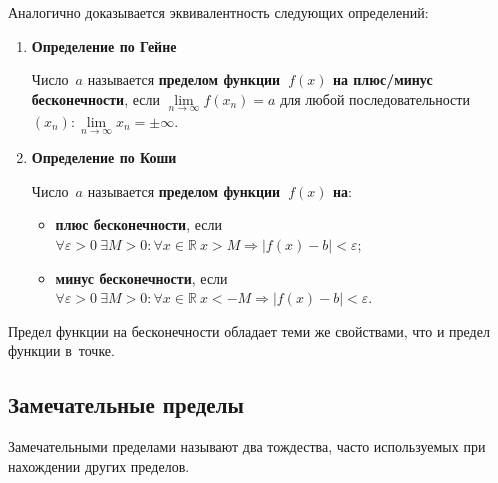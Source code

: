 Аналогично доказывается эквивалентность следующих определений:
\begin{enumerate}
	\item \textbf{Определение по Гейне}
	
	Число~$a$ называется \textbf{пределом функции~$f(x)$ на плюс/минус бесконечности}, если $\lim\limits_{n \to \infty} f(x_n) = a$ для любой последовательности~$(x_n) \colon \lim\limits_{n \to \infty} x_n = \pm\infty$.
	
	\item \textbf{Определение по Коши}
	
	Число~$a$ называется \textbf{пределом функции~$f(x)$ на}:
	\begin{itemize}
		\item \textbf{плюс бесконечности}, если $\forall \varepsilon > 0 \ \exists M > 0 \colon \forall x \in \mathbb R \ x > M \Rightarrow |f(x) - b| < \varepsilon$;
		\item \textbf{минус бесконечности}, если $\forall \varepsilon > 0 \ \exists M > 0 \colon \forall x \in \mathbb R \ x < -M \Rightarrow |f(x) - b| < \varepsilon$.
	\end{itemize}
\end{enumerate}

Предел функции на бесконечности обладает теми же свойствами, что и предел функции в~точке.

\subsection{Замечательные пределы}
Замечательными пределами называют два тождества, часто используемых при нахождении других пределов.


